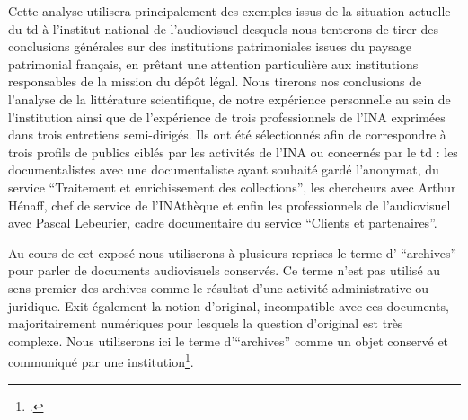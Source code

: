 Cette analyse utilisera principalement des exemples issus de la situation actuelle du \gls{td} à l'institut national de l'audiovisuel desquels nous tenterons de tirer des conclusions générales sur des institutions patrimoniales issues du paysage patrimonial français, en prêtant une attention particulière aux institutions responsables de la mission du dépôt légal. Nous tirerons nos conclusions de l'analyse de la littérature scientifique, de notre expérience personnelle au sein de l'institution ainsi que de l’expérience de trois professionnels de l'INA exprimées dans trois entretiens semi-dirigés. Ils ont été sélectionnés afin de correspondre à trois profils de publics ciblés par les activités de l'INA ou concernés par le \gls{td} : les documentalistes avec une documentaliste ayant souhaité gardé l'anonymat, du service \enquote{Traitement et enrichissement des collections}, les chercheurs avec Arthur Hénaff, chef de service de l'INAthèque et enfin les professionnels de l'audiovisuel avec Pascal Lebeurier, cadre documentaire du service \enquote{Clients et partenaires}. 


Au cours de cet exposé nous utiliserons à plusieurs reprises le terme d' \enquote{archives} pour parler de documents audiovisuels conservés. Ce terme n'est pas utilisé au sens premier des archives comme le résultat d'une activité administrative ou juridique. Exit également la notion d'original, incompatible avec ces documents, majoritairement numériques pour lesquels la question d'original est très complexe. Nous utiliserons ici le terme d'\enquote{archives} comme un objet conservé et communiqué par une institution\footcite[Réflexion inspirée de l'article suivant][]{zotero-item-739}. 